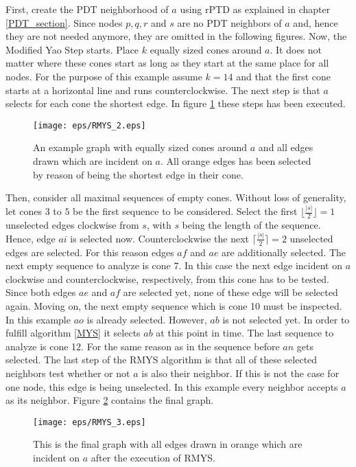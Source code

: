 First, create the PDT neighborhood of $a $ using rPTD as explained in chapter \ref{PDT_section}.
Since nodes $p, q, r $ and $s $ are no PDT neighbors of $a $ and, hence they are not needed anymore, they are omitted in the following figures.
Now, the Modified Yao Step starts.
Place $k $ equally sized cones around $a $.
It does not matter where these cones start as long as they start at the same place for all nodes.
For the purpose of this example assume $k=14 $ and that the first cone starts at a horizontal line and runs counterclockwise.
The next step is that $a $ selects for each cone the shortest edge.
In figure \ref{fig:RMYS_2} these steps has been executed.
\begin{figure}[h!]
\centering
\texttt{[image: eps/RMYS\_2.eps]}
\caption{An example graph with equally sized cones around $a $ and all edges drawn which are incident on $a $. All orange edges has been selected by reason of being the shortest edge in their cone.}
\label{fig:RMYS_2}
\end{figure}
Then, consider all maximal sequences of empty cones.
Without loss of generality, let cones $3 $ to $5 $ be the first sequence to be considered.
Select the first $\lfloor \frac{|s|}{2} \rfloor = 1 $ unselected edges clockwise from $s $, with $s $ being the length of the sequence.
Hence, edge $ai $ is selected now.
Counterclockwise the next $\lceil \frac{|s|}{2} \rceil = 2$ unselected edges are selected.
For this reason edges $af $ and $ae $ are additionally selected.
The next empty sequence to analyze is cone 7.
In this case the next edge incident on $a $ clockwise and counterclockwise, respectively, from this cone has to be tested.
Since both edges $ae $ and $af $ are selected yet, none of these edge will be selected again.
Moving on, the next empty sequence which is cone 10 must be inspected.
In this example $ao $ is already selected. 
However, $ab $ is not selected yet.
In order to fulfill algorithm \ref{MYS} it selects $ab $ at this point in time.
The last sequence to analyze is cone 12.
For the same reason as in the sequence before $an $ gets selected.
The last step of the RMYS algorithm is that all of these selected neighbors test whether or not $a $ is also their neighbor.
If this is not the case for one node, this edge is being unselected.
In this example every neighbor accepts $a $ as its neighbor.
Figure \ref{fig:RMYS_3} contains the final graph.

\begin{figure}[h!]
\centering
\texttt{[image: eps/RMYS\_3.eps]}
\caption{This is the final graph with all edges drawn in orange which are incident on $a $ after the execution of RMYS.}
\label{fig:RMYS_3}
\end{figure}





